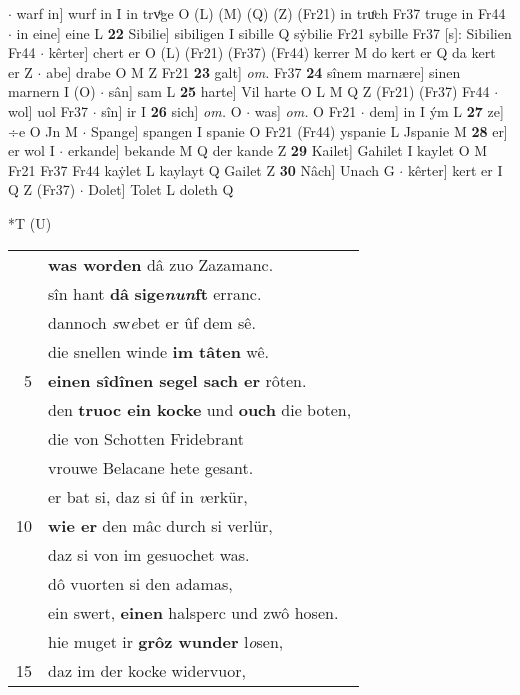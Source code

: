 \documentclass[8pt,a4paper,notitlepage]{article}
\begin{document}
\begin{table}[ht]
\begin{minipage}[t]{0.5\linewidth}
$\cdot$ warf in] wurf in I in trvͦge O (L) (M) (Q) (Z) (Fr21) in truͦch Fr37 truge in Fr44  $\cdot$ in eine] eine L \textbf{22} Sibilie] sibiligen I sibille Q sẏbilie Fr21 sybille Fr37 [s]: Sibilien Fr44  $\cdot$ kêrter] chert er O (L) (Fr21) (Fr37) (Fr44) kerrer M do kert er Q da kert er Z  $\cdot$ abe] drabe O M Z Fr21 \textbf{23} galt] \textit{om.} Fr37 \textbf{24} sînem marnære] sinen marnern I (O)  $\cdot$ sân] sam L \textbf{25} harte] Vil harte O L M Q Z (Fr21) (Fr37) Fr44  $\cdot$ wol] uol Fr37  $\cdot$ sîn] ir I \textbf{26} sich] \textit{om.} O  $\cdot$ was] \textit{om.} O Fr21  $\cdot$ dem] in I ým L \textbf{27} ze] ÷e O Jn M  $\cdot$ Spange] spangen I spanie O Fr21 (Fr44) yspanie L Jspanie M \textbf{28} er] er wol I  $\cdot$ erkande] bekande M Q der kande Z \textbf{29} Kailet] Gahilet I kaylet O M Fr21 Fr37 Fr44 kaẏlet L kaylayt Q Gailet Z \textbf{30} Nâch] Unach G  $\cdot$ kêrter] kert er I Q Z (Fr37)  $\cdot$ Dolet] Tolet L doleth Q \newline
\end{minipage}
\hspace{0.5cm}
\begin{minipage}[t]{0.5\linewidth}
\small
\begin{center}*T (U)
\end{center}
\begin{tabular}{rl}
 & \textbf{was worden} dâ zuo Zazamanc.\\ 
 & sîn hant \textbf{dâ} \textbf{sige\textit{nun}ft} erranc.\\ 
 & dannoch \textit{s}w\textit{e}bet er ûf dem sê.\\ 
 & die snellen winde \textbf{im tâten} wê.\\ 
5 & \textbf{einen sîdînen segel sach er} rôten.\\ 
 & den \textbf{truoc ein kocke} und \textbf{ouch} die boten,\\ 
 & die von Schotten Fridebrant\\ 
 & vrouwe Belacane hete gesant.\\ 
 & er bat si, daz si ûf in \textit{v}erkür,\\ 
10 & \textbf{wie er} den mâc durch si verlür,\\ 
 & daz si von im gesuochet was.\\ 
 & dô vuorten si den adamas,\\ 
 & ein swert, \textbf{einen} halsperc und zwô hosen.\\ 
 & hie muget ir \textbf{grôz wunder} l\textit{o}sen,\\ 
15 & daz im der kocke widervuor,\\ 

\end{tabular}
\end{minipage}
\end{table}
\end{document}
